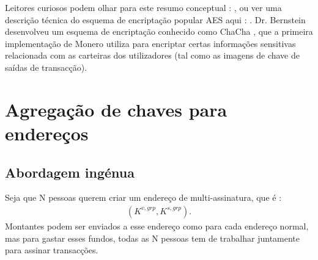 Leitores curiosos podem olhar para este resumo conceptual : \cite{tutorialspoint-cryptography}, ou ver uma descrição técnica do esquema de encriptação popular AES aqui : \cite{AES-encryption}. Dr. Bernstein desenvolveu um esquema de encriptação conhecido como ChaCha \cite{Bernstein_chacha,chacha-irtf}, que a primeira implementação de Monero utiliza para encriptar certas informações sensitivas  relacionada com as carteiras dos utilizadores (tal como as imagens de chave de saídas de transacção).   


\section{Agregação de chaves para endereços}
\label{sec:key-aggregation}

\subsection{Abordagem ingénua}
\label{sec:naive-key-aggregation}

Seja que N pessoas querem criar um endereço de multi-assinatura, que é :
\begin{align*}
(K^{v,grp},K^{s,grp}).
\end{align*}
Montantes podem ser enviados a esse endereço como para cada endereço normal, mas para gastar esses fundos, todas as N pessoas tem de trabalhar juntamente para assinar transacções.


